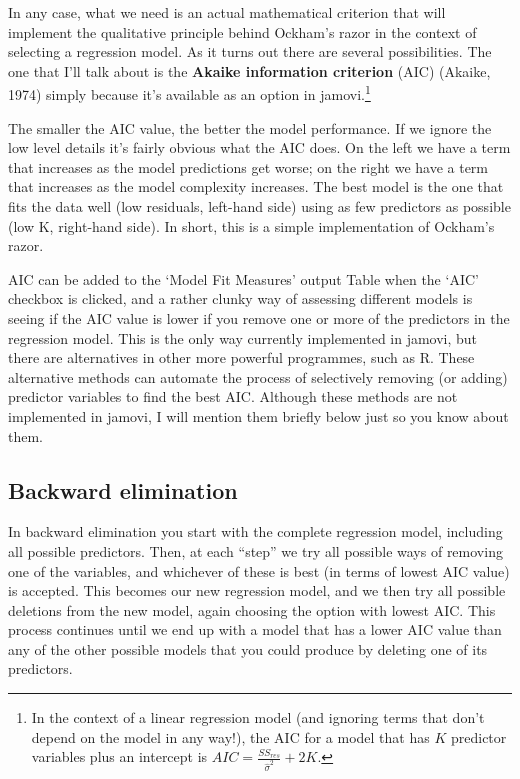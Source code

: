 \documentclass[
  a4paper,
]{book}
\begin{document}
In any case, what we need is an actual mathematical criterion that will
implement the qualitative principle behind Ockham's razor in the context
of selecting a regression model. As it turns out there are several
possibilities. The one that I'll talk about is the \textbf{Akaike
information criterion} (AIC) (Akaike, 1974) simply because it's
available as an option in jamovi.\footnote{In the context of a linear
  regression model (and ignoring terms that don't depend on the model in
  any way!), the AIC for a model that has \(K\) predictor variables plus
  an intercept is \(AIC=\frac{SS_{res}}{\hat{\sigma}^2}+2K\).}

The smaller the AIC value, the better the model performance. If we
ignore the low level details it's fairly obvious what the AIC does. On
the left we have a term that increases as the model predictions get
worse; on the right we have a term that increases as the model
complexity increases. The best model is the one that fits the data well
(low residuals, left-hand side) using as few predictors as possible (low
K, right-hand side). In short, this is a simple implementation of
Ockham's razor.

AIC can be added to the `Model Fit Measures' output Table when the `AIC'
checkbox is clicked, and a rather clunky way of assessing different
models is seeing if the AIC value is lower if you remove one or more of
the predictors in the regression model. This is the only way currently
implemented in jamovi, but there are alternatives in other more powerful
programmes, such as R. These alternative methods can automate the
process of selectively removing (or adding) predictor variables to find
the best AIC. Although these methods are not implemented in jamovi, I
will mention them briefly below just so you know about them.

\hypertarget{backward-elimination}{%
\subsection{Backward elimination}\label{backward-elimination}}

In backward elimination you start with the complete regression model,
including all possible predictors. Then, at each ``step'' we try all
possible ways of removing one of the variables, and whichever of these
is best (in terms of lowest AIC value) is accepted. This becomes our new
regression model, and we then try all possible deletions from the new
model, again choosing the option with lowest AIC. This process continues
until we end up with a model that has a lower AIC value than any of the
other possible models that you could produce by deleting one of its
predictors.
\end{document}

